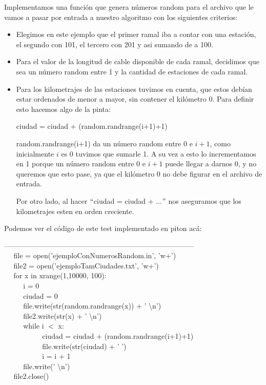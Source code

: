 Implementamos una función que genera números random para el archivo que le vamos a pasar por entrada a nuestro algoritmo con los siguientes criterios:
\begin{itemize}
\item Elegimos en este ejemplo que el primer ramal iba a contar con una estación, el segundo con 101, el tercero con 201 y asi sumando de a 100.
\item Para el valor de la longitud de cable disponible de cada ramal, decidimos que sea un número random entre 1 y la cantidad de estaciones de cada ramal.
\item Para los kilometrajes de las estaciones tuvimos en cuenta, que estos debían estar ordenados de menor a mayor, sin contener el kilómetro 0. Para definir esto hacemos algo de la pinta:

ciudad = ciudad + (random.randrange(i+1)+1)

random.randrange(i+1) da un número random entre 0 e $i+1$, como inicialmente $i$ es 0 tuvimos que sumarle 1. A su vez a esto lo incrementamos en 1 porque un número random entre 0 e $i+1$ puede llegar a darnos 0, y no queremos que esto pase, ya que el kilómetro 0 no debe figurar en el archivo de entrada.

Por otro lado, al hacer $``$ciudad = ciudad + ...$"$ nos aseguramos que los kilometrajes esten en orden creciente.

\end{itemize}

Podemos ver el código de este test implementado en piton acá:

--------------------------------------------------------------------------------\\
$~~~~~~$file = open('ejemploConNumerosRandom.in', 'w+')\\
$~~~~~~$file2 = open('ejemploTamCiudades.txt', 'w+')\\
$~~~~~~$for x in xrange(1,10000, 100):\\
$~~~~~~~~~~~~$i = 0\\
$~~~~~~~~~~~~$ciudad = 0\\
$~~~~~~~~~~~~$file.write(str(random.randrange(x)) + ' \textbackslash n')\\
$~~~~~~~~~~~~$file2.write(str(x) + ' \textbackslash n')\\
$~~~~~~~~~~~~$while i $<$ x:\\
$~~~~~~~~~~~~~~~~~~~~~~~~$ciudad = ciudad + (random.randrange(i+1)+1)\\
$~~~~~~~~~~~~~~~~~~~~~~~~$file.write(str(ciudad) + ' ')\\
$~~~~~~~~~~~~~~~~~~~~~~~~$i = i + 1\\
$~~~~~~~~~~~~$file.write(' \textbackslash n')\\
$~~~~~~$file2.close()\\

